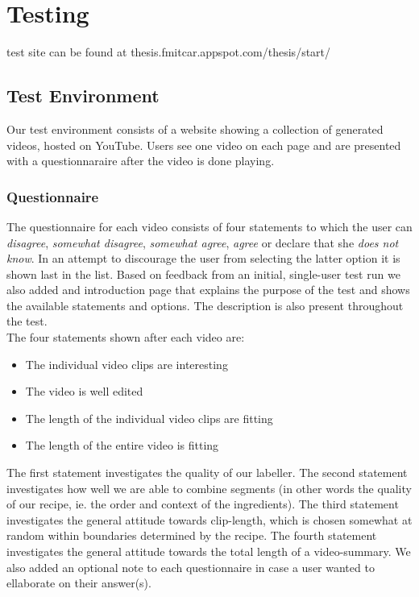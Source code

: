 %
\section{Testing}
%
test site can be found at thesis.fmitcar.appspot.com/thesis/start/
%
\subsection{Test Environment}
%
Our test environment consists of a website showing a collection of generated videos, hosted on YouTube. Users see one video on each page and are presented with a questionnaraire after the video is done playing.
%
\subsubsection{Questionnaire}
%
%
The questionnaire for each video consists of four statements to which the user can \textit{disagree}, \textit{somewhat disagree}, \textit{somewhat agree}, \textit{agree} or declare that she \textit{does not know}. In an attempt to discourage the user from selecting the latter option it is shown last in the list. Based on feedback from an initial, single-user test run we also added and introduction page that explains the purpose of the test and shows the available statements and options. The description is also present throughout the test.\\
%
The four statements shown after each video are:
%
\begin{itemize}
\item The individual video clips are interesting
\item The video is well edited
\item The length of the individual video clips are fitting
\item The length of the entire video is fitting
\end{itemize}
%
The first statement investigates the quality of our labeller. The second statement investigates how well we are able to combine segments (in other words the quality of our recipe, ie. the order and context of the ingredients). The third statement investigates the general attitude towards clip-length, which is chosen somewhat at random within boundaries determined by the recipe. The fourth statement investigates the general attitude towards the total length of a video-summary. We also added an optional note to each questionnaire in case a user wanted to ellaborate on their answer(s).
%

